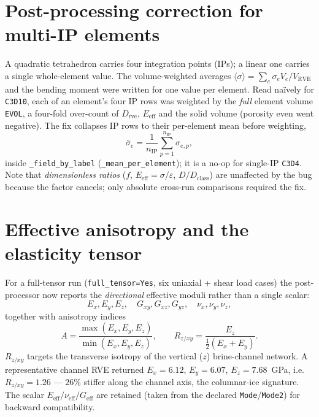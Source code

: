 \documentclass[11pt]{article}
\newcommand{\code}[1]{\texttt{\small #1}}
\newcommand{\env}[1]{\texttt{\small #1}}
\begin{document}
\section{Post-processing correction for multi-IP elements}
\label{sec:multiip}
A quadratic tetrahedron carries four integration points (IPs); a linear one
carries a single whole-element value. The volume-weighted averages
$\langle\sigma\rangle = \sum_e \sigma_e V_e / V_\text{RVE}$ and the bending
moment were written for one value per element. Read na\"ively for \code{C3D10},
each of an element's four IP rows was weighted by the \emph{full} element volume
\code{EVOL}, a four-fold over-count of $D_\text{rve}$, $E_\text{eff}$ and the
solid volume (porosity even went negative). The fix collapses IP rows to their
per-element mean before weighting,
\begin{equation}
  \bar{\sigma}_e=\frac{1}{n_\text{IP}}\sum_{p=1}^{n_\text{IP}}\sigma_{e,p},
\end{equation}
inside \code{\_field\_by\_label} (\code{\_mean\_per\_element}); it is a no-op for
single-IP \code{C3D4}. Note that \emph{dimensionless ratios} ($f$,
$E_\text{eff}=\sigma/\varepsilon$, $D/D_\text{class}$) are unaffected by the bug
because the factor cancels; only absolute cross-run comparisons required the fix.

\section{Effective anisotropy and the elasticity tensor}
\label{sec:aniso}
For a full-tensor run (\env{full\_tensor=Yes}, six uniaxial + shear load cases)
the post-processor now reports the \emph{directional} effective moduli rather
than a single scalar:
\[
  E_x,E_y,E_z,\quad G_{xy},G_{xz},G_{yz},\quad \nu_x,\nu_y,\nu_z,
\]
together with anisotropy indices
\begin{equation}
  A=\frac{\max(E_x,E_y,E_z)}{\min(E_x,E_y,E_z)},
  \qquad
  R_{z/xy}=\frac{E_z}{\tfrac12(E_x+E_y)} .
\end{equation}
$R_{z/xy}$ targets the transverse isotropy of the vertical ($z$) brine-channel
network. A representative channel RVE returned
$E_x{=}6.12$, $E_y{=}6.07$, $E_z{=}7.68$~GPa, i.e.\ $R_{z/xy}=1.26$ ---
$26\%$ stiffer along the channel axis, the columnar-ice signature. The scalar
$E_\text{eff}/\nu_\text{eff}/G_\text{eff}$ are retained (taken from the declared
\code{Mode}/\code{Mode2}) for backward compatibility.
\end{document}
